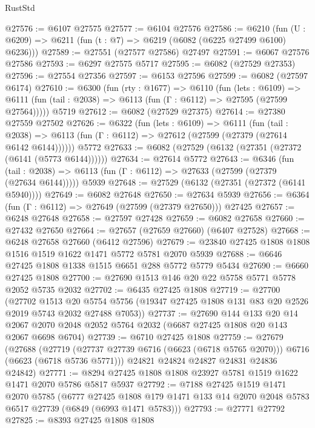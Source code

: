 \begin{lexlean}{RustStd}
\begin{coremodule}
@27576 := @6107 @27575
@27577 := @6104 @27576
@27586 := @6210
    (fun (U : @6209) => @6211 (fun (t : @7) => @6219 (@6082 (@6225 @27499 @6100) @6236)))
@27589 := @27551 (@27577 @27586) @27497
@27591 := @6067 @27576 @27586
@27593 := @6297 @27575 @5717
@27595 := @6082 (@27529 @27353)
@27596 := @27554 @27356
@27597 := @6153 @27596
@27599 := @6082 (@27597 @6174)
@27610 := @6300
    (fun (rty : @1677) =>
    @6110
      (fun (lets : @6109) =>
      @6111 (fun (tail : @2038) => @6113 (fun (Γ : @6112) => @27595 (@27599 @27564)))))
    @5719
@27612 := @6082 (@27529 @27375)
@27614 := @27380 @27559 @27502
@27626 := @6322
    (fun (lets : @6109) =>
    @6111
      (fun (tail : @2038) =>
      @6113 (fun (Γ : @6112) => @27612 (@27599 (@27379 (@27614 @6142 @6144))))))
    @5772
@27633 := @6082 (@27529 (@6132 (@27351 (@27372 (@6141 (@5773 @6144))))))
@27634 := @27614 @5772
@27643 := @6346
    (fun (tail : @2038) => @6113 (fun (Γ : @6112) => @27633 (@27599 (@27379 (@27634 @6144)))))
    @5939
@27648 := @27529 (@6132 (@27351 (@27372 (@6141 @5940))))
@27649 := @6082 @27648
@27650 := @27634 @5939
@27656 := @6364 (fun (Γ : @6112) => @27649 (@27599 (@27379 @27650))) @27425
@27657 := @6248 @27648
@27658 := @27597 @27428
@27659 := @6082 @27658
@27660 := @27432 @27650
@27664 := @27657 (@27659 @27660) (@6407 @27528)
@27668 := @6248 @27658 @27660 (@6412 @27596)
@27679 := @23840 @27425 @1808 @1808 @1516 @1519 @1622 @1471 @5772 @5781 @2070 @5939
@27688 := @6646 @27425 @1808 @1338 @1515 @6651 @288 @5772 @5779 @5434
@27690 := @6660 @27425 @1808
@27700 := @27690 @1513 @146 @20 @22 @5758 @5771 @5778 @2052 @5735 @2032
@27702 := @6435 @27425 @1808
@27719 := @27700
    (@27702
      @1513
      @20
      @5754
      @5756
      (@19347 @27425 @1808 @131 @83 @20 @2526 @2019 @5743 @2032 @27488 @7053))
@27737 := @27690
    @144
    @133
    @20
    @14
    @2067
    @2070
    @2048
    @2052
    @5764
    @2032
    (@6687 @27425 @1808 @20 @143 @2067 @6698 @6704)
@27739 := @6710 @27425 @1808
@27759 := @27679
    (@27688
      (@27719 (@27737 @27739 @6716 (@6623 (@6718 @5765 @2070))) @6716 (@6623 (@6718 @5736 @5771)))
      @24821
      @24824
      @24827
      @24831
      @24836
      @24842)
@27771 := @8294 @27425 @1808 @1808 @23927 @5781 @1519 @1622 @1471 @2070 @5786 @5817 @5937
@27792 := @7188
    @27425
    @1519
    @1471
    @2070
    @5785
    (@6777
      @27425
      @1808
      @179
      @1471
      @133
      @14
      @2070
      @2048
      @5783
      @6517
      @27739
      (@6849 (@6993 @1471 @5783)))
@27793 := @27771 @27792
@27825 := @8393
    @27425
    @1808
    @1808

\end{coremodule}
\end{lexlean}
